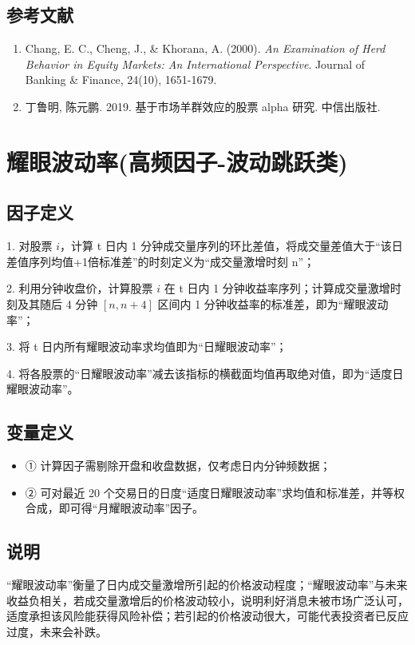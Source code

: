 \documentclass{article}
\begin{document}
\subsection{参考文献}
\begin{enumerate}
    \item Chang, E. C., Cheng, J., \& Khorana, A. (2000). \textit{An Examination of Herd Behavior in Equity Markets: An International Perspective}. Journal of Banking \& Finance, 24(10), 1651-1679.
    \item 丁鲁明, 陈元鹏. 2019. 基于市场羊群效应的股票 alpha 研究. 中信出版社.
\end{enumerate}

\section{耀眼波动率(高频因子-波动跳跃类)}

\subsection{因子定义}

1. 对股票 \( i \)，计算 t 日内 1 分钟成交量序列的环比差值，将成交量差值大于“该日差值序列均值+1倍标准差”的时刻定义为“成交量激增时刻 n”；

2. 利用分钟收盘价，计算股票 \( i \) 在 t 日内 1 分钟收益率序列；计算成交量激增时刻及其随后 4 分钟 \([n, n+4]\) 区间内 1 分钟收益率的标准差，即为“耀眼波动率”；

3. 将 t 日内所有耀眼波动率求均值即为“日耀眼波动率”；

4. 将各股票的“日耀眼波动率”减去该指标的横截面均值再取绝对值，即为“适度日耀眼波动率”。

\subsection{变量定义}
\begin{itemize}
    \item ① 计算因子需剔除开盘和收盘数据，仅考虑日内分钟频数据；
    \item ② 可对最近 20 个交易日的日度“适度日耀眼波动率”求均值和标准差，并等权合成，即可得“月耀眼波动率”因子。
\end{itemize}

\subsection{说明}
“耀眼波动率”衡量了日内成交量激增所引起的价格波动程度；“耀眼波动率”与未来收益负相关，若成交量激增后的价格波动较小，说明利好消息未被市场广泛认可，适度承担该风险能获得风险补偿；若引起的价格波动很大，可能代表投资者已反应过度，未来会补跌。
\end{document}
